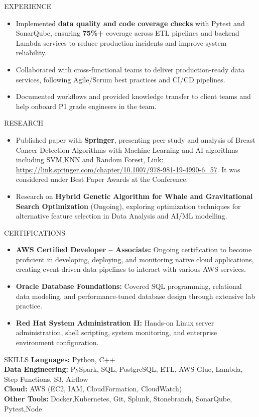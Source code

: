 \documentclass[10pt]{resume}
\begin{document}
\begin{rSection}{EXPERIENCE}
\begin{itemize}
  \item Implemented \textbf{data quality and code coverage checks} with Pytest and SonarQube, ensuring \textbf{75\%+} coverage across ETL pipelines and backend Lambda services to reduce production incidents and improve system reliability.
  \item Collaborated with cross-functional teams to deliver production-ready data services, following Agile/Scrum best practices and CI/CD pipelines.
  \item Documented workflows and provided knowledge transfer to client teams and help onboard P1 grade engineers in the team.
\end{itemize}
\end{rSection}

\begin{rSection}{RESEARCH}
\begin{itemize}
  \item Published paper with \textbf{Springer}, presenting peer study and analysis of Breast Cancer Detection Algorithms with Machine Learning and AI algorithms including SVM,KNN and Random Forest, Link: \href{https://link.springer.com/chapter/10.1007/978-981-19-4990-6_57}{https://link.springer.com/chapter/10.1007/978-981-19-4990-6\_57}. It was considered under Best Paper Awards at the Conference.
  \item  Research on \textbf{Hybrid Genetic Algorithm for Whale and Gravitational Search Optimization} (Ongoing), exploring optimization techniques for alternative feature selection in Data Analysis and AI/ML modelling.
\end{itemize}
\end{rSection}

\begin{rSection}{CERTIFICATIONS}
\begin{itemize}
  \item \textbf{AWS Certified Developer – Associate:} Ongoing certification to become proficient in developing, deploying, and monitoring native cloud applications, creating event-driven data pipelines to interact with various AWS services.
  \item \textbf{Oracle Database Foundations:} Covered SQL programming, relational data modeling, and performance-tuned database design through extensive lab practice.
  \item \textbf{Red Hat System Administration II:} Hands-on Linux server administration, shell scripting, system monitoring, and enterprise environment configuration.
\end{itemize}
\end{rSection}

\begin{rSection}{SKILLS}
\textbf{Languages:} Python, C++ \\
\textbf{Data Engineering:} PySpark, SQL, PostgreSQL, ETL, AWS Glue, Lambda, Step Functions, S3, Airflow \\
\textbf{Cloud:} AWS (EC2, IAM, CloudFormation, CloudWatch) \\
\textbf{Other Tools:} Docker,Kubernetes, Git, Splunk, Stonebranch, SonarQube, Pytest,Node
\end{rSection}
\end{document}

